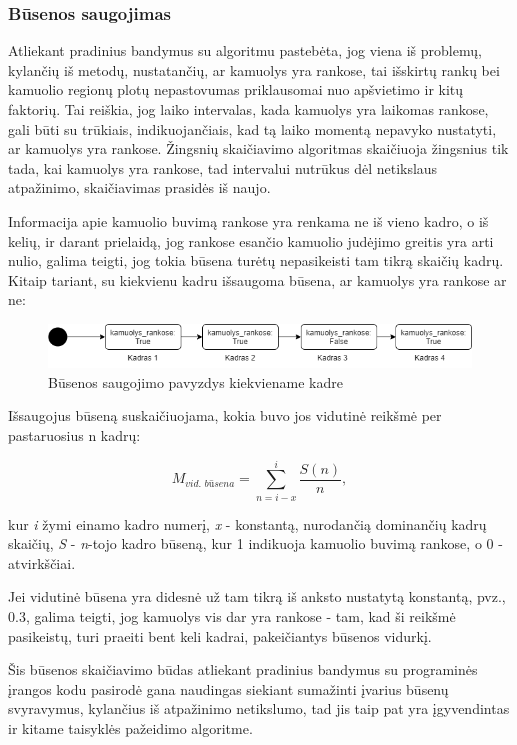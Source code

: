 \documentclass{VUMIFPSbakalaurinis}
\begin{document}
\subsubsection{Būsenos saugojimas}
Atliekant pradinius bandymus su algoritmu pastebėta, jog viena iš problemų, kylančių iš metodų, nustatančių, ar kamuolys yra rankose, tai išskirtų rankų bei kamuolio regionų plotų nepastovumas priklausomai nuo apšvietimo ir kitų faktorių. Tai reiškia, jog laiko intervalas, kada kamuolys yra laikomas rankose, gali būti su trūkiais, indikuojančiais, kad tą laiko momentą nepavyko nustatyti, ar kamuolys yra rankose. Žingsnių skaičiavimo algoritmas skaičiuoja žingsnius tik tada, kai kamuolys yra rankose, tad intervalui nutrūkus dėl netikslaus atpažinimo, skaičiavimas prasidės iš naujo. 

Informacija apie kamuolio buvimą rankose yra renkama ne iš vieno kadro, o iš kelių, ir darant prielaidą, jog rankose esančio kamuolio judėjimo greitis yra arti nulio, galima teigti, jog tokia būsena turėtų nepasikeisti tam tikrą skaičių kadrų. Kitaip tariant, su kiekvienu kadru išsaugoma būsena, ar kamuolys yra rankose ar ne:

\begin{figure}[H]
	\centering
	\includegraphics[scale=0.6]{img/state}
	\caption{Būsenos saugojimo pavyzdys kiekviename kadre}
	\label{img:state}
\end{figure}

Išsaugojus būseną suskaičiuojama, kokia buvo jos vidutinė reikšmė per pastaruosius n kadrų: 

\begin{equation}\label{eq:avg_state}
	M_{\textit{vid. būsena}} = \sum_{n=i-x}^{i} \frac{S(n)}{n},
\end{equation}

kur \textit{i} žymi einamo kadro numerį, \textit{x} - konstantą, nurodančią dominančių kadrų skaičių, \textit{S} - \textit{n}-tojo kadro būseną, kur 1 indikuoja kamuolio buvimą rankose, o 0 - atvirkščiai.

Jei vidutinė būsena yra didesnė už tam tikrą iš anksto nustatytą konstantą, pvz., 0.3, galima teigti, jog kamuolys vis dar yra rankose - tam, kad ši reikšmė pasikeistų, turi praeiti bent keli kadrai, pakeičiantys būsenos vidurkį. 

Šis būsenos skaičiavimo būdas atliekant pradinius bandymus su programinės įrangos kodu pasirodė gana naudingas siekiant sumažinti įvarius būsenų svyravymus, kylančius iš atpažinimo netikslumo, tad jis taip pat yra įgyvendintas ir kitame taisyklės pažeidimo algoritme. 
\end{document}
